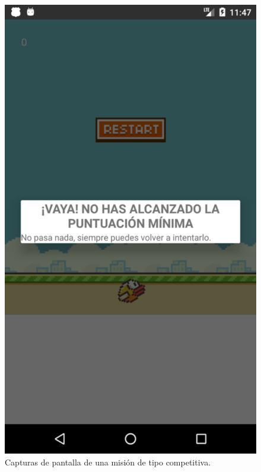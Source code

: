 \documentclass[twoside]{report}
\begin{document}
\begin{figure}[H]
\begin{center}
\includegraphics[scale=0.25]{images/userguide/30.png}
\caption{Capturas de pantalla de una misión de tipo competitiva.}
\end{center}
\end{figure}
\end{document}
